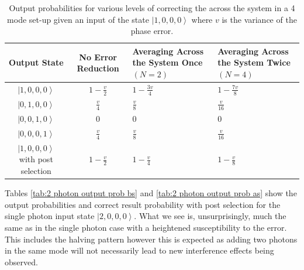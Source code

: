 \documentclass[aps,pra,twocolumn,superscriptaddress,numerical,floatfix]{revtex4-1}
\begin{document}
\begin{widetext}
\begin{table}
{\begin{centering}
	\begin{tabular}{|c|c|>{\centering}p{4cm}|>{\centering}p{4cm}|}
		\hline 
		Output State & No Error Reduction & Averaging Across the System Once $\left(N=2\right)$ & Averaging Across the System Twice $\left(N=4\right)$\tabularnewline
		\hline 
		\hline 
		$\left|1,0,0,0\right\rangle $ & $1-\frac{v}{2}$ & $1-\frac{3v}{4}$ & $1-\frac{7v}{8}$\tabularnewline
		\hline 
		$\left|0,1,0,0\right\rangle $ & $\frac{v}{4}$ & $\frac{v}{8}$ & $\frac{v}{16}$\tabularnewline
		\hline 
		$\left|0,0,1,0\right\rangle $ & $0$ & $0$ & $0$\tabularnewline
		\hline 
		$\left|0,0,0,1\right\rangle $ & $\frac{v}{4}$ & $\frac{v}{8}$ & $\frac{v}{16}$\tabularnewline
		\hline 
		$\left|1,0,0,0\right\rangle $ with post selection & $1-\frac{v}{2}$ & $1-\frac{v}{4}$ & $1-\frac{v}{8}$\tabularnewline
		\hline 
	\end{tabular}
	\par\end{centering}

}

\caption[Output probabilities for various levels of correcting the across the
system in a 4 mode set-up given an input of the state $\left|1,0,0,0\right\rangle $.]{Output probabilities for various levels of correcting the across
the system in a 4 mode set-up given an input of the state $\left|1,0,0,0\right\rangle $
where $v$ is the variance of the phase error. \label{tab:1 photon output prob as}}
\end{table}


Tables \ref{tab:2 photon output prob bs} and \ref{tab:2 photon output prob as}
show the output probabilities and correct result probability with
post selection for the single photon input state $\left|2,0,0,0\right\rangle $.
What we see is, unsurprisingly, much the same as in the single photon
case with a heightened susceptibility to the error. This includes
the halving pattern however this is expected as adding two photons
in the same mode will not necessarily lead to new interference effects
being observed.

\begin{table}
\resizebox{\textwidth}{!}{

}
\end{table}
\end{widetext}
\end{document}
